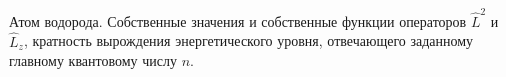 \documentclass[__main__.tex]{subfiles}
\begin{document}
Атом водорода. Собственные значения и собственные функции операторов $\hat{L}^2$ и $\hat{L}_z$, кратность вырождения энергетического уровня, отвечающего заданному главному квантовому числу $n$.\\ 

\end{document}
